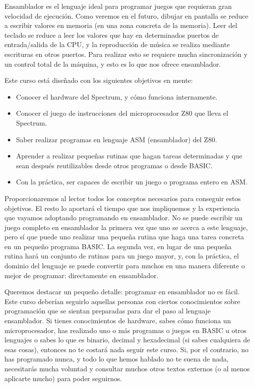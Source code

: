 \documentclass[letterpaper,10pt,spanish]{sphinxmanual}
\begin{document}
Ensamblador es el lenguaje ideal para programar juegos que requieran gran velocidad de ejecución. Como veremos en el futuro, dibujar en pantalla se reduce a escribir valores en memoria (en una zona concreta de la memoria). Leer del teclado se reduce a leer los valores que hay en determinados puertos de entrada/salida de la CPU, y la reproducción de música se realiza mediante escrituras en otros puertos. Para realizar esto se requiere mucha sincronización y un control total de la máquina, y esto es lo que nos ofrece ensamblador.

Este curso está diseñado con los siguientes objetivos en mente:
\begin{itemize}
\item {} 
Conocer el hardware del Spectrum, y cómo funciona internamente.

\item {} 
Conocer el juego de instrucciones del microprocesador Z80 que lleva el Spectrum.

\item {} 
Saber realizar programas en lenguaje ASM (ensamblador) del Z80.

\item {} 
Aprender a realizar pequeñas rutinas que hagan tareas determinadas y que sean después reutilizables desde otros programas o desde BASIC.

\item {} 
Con la práctica, ser capaces de escribir un juego o programa entero en ASM.

\end{itemize}

Proporcionaremos al lector todos los conceptos necesarios para conseguir estos objetivos. El resto lo aportará el tiempo que nos impliquemos y la experiencia que vayamos adoptando programando en ensamblador. No se puede escribir un juego completo en ensamblador la primera vez que uno se acerca a este lenguaje, pero sí que puede uno realizar una pequeña rutina que haga una tarea concreta en un pequeño programa BASIC. La segunda vez, en lugar de una pequeña rutina hará un conjunto de rutinas para un juego mayor, y, con la práctica, el dominio del lenguaje se puede convertir para muchos en una manera diferente o mejor de programar: directamente en ensamblador.

Queremos destacar un pequeño detalle: programar en ensamblador no es fácil. Este curso deberían seguirlo aquellas personas con ciertos conocimientos sobre programación que se sientan preparadas para dar el paso al lenguaje ensamblador. Si tienes conocimientos de hardware, sabes cómo funciona un microprocesador, has realizado uno o más programas o juegos en BASIC u otros lenguajes o sabes lo que es binario, decimal y hexadecimal (si sabes cualquiera de esas cosas), entonces no te costará nada seguir este curso. Si, por el contrario, no has programado nunca, y todo lo que hemos hablado no te suena de nada, necesitarás mucha voluntad y consultar muchos otros textos externos (o al menos aplicarte mucho) para poder seguirnos.
\end{document}
